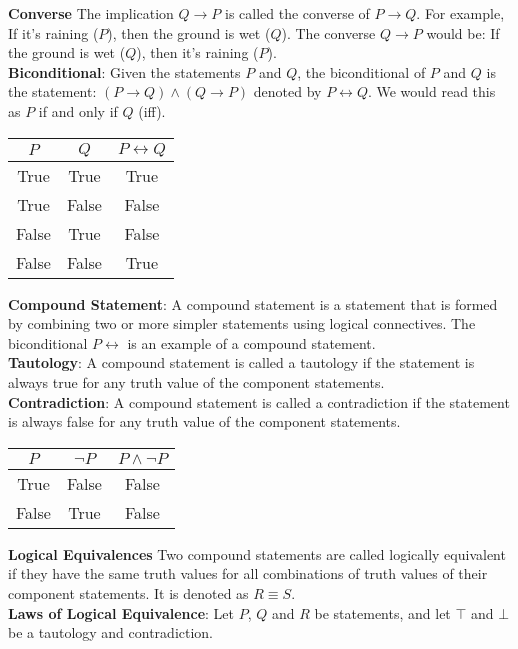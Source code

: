 \documentclass{article}
\begin{document}
\textbf{Converse} The implication \(Q \rightarrow P\) is called the converse of \(P \rightarrow Q\). For example, If it's raining (\(P\)), then the ground is wet (\(Q\)). The converse \(Q \rightarrow P\) would be: If the ground is wet (\(Q\)), then it's raining (\(P\)).\\
\textbf{Biconditional}: Given the statements \(P\) and \(Q\), the biconditional of \(P\) and \(Q\) is the statement: \((P \rightarrow Q) \land (Q \rightarrow P)\) denoted by \(P \leftrightarrow Q\). We would read this as \(P\) if and only if \(Q\) (iff).
\begin{center}
\begin{tabular}{|c|c|c|}
\hline
\(P\) & \(Q\) & \(P \leftrightarrow Q\) \\
\hline
True & True & True \\
True & False & False \\
False & True & False \\
False & False & True \\
\hline
\end{tabular}
\end{center}
\textbf{Compound Statement}: A compound statement is a statement that is formed by combining two or more simpler statements using logical connectives. The biconditional \(P \leftrightarrow\) is an example of a compound statement.\\
\textbf{Tautology}: A compound statement is called a tautology if the statement is always true for any truth value of the component statements.\\
\textbf{Contradiction}:  A compound statement is called a contradiction if the statement is always false for any truth value of the component statements.
\begin{center}
\begin{tabular}{|c|c|c|}
\hline
\(P\) & \(\neg P\) & \(P \land \neg P\) \\
\hline
True & False & False \\
False & True & False \\
\hline
\end{tabular}
\end{center}
\textbf{Logical Equivalences} Two compound statements are called logically equivalent if they have the same truth values for all combinations of truth values of their component statements. It is denoted as \(R \equiv S\).\\
\textbf{Laws of Logical Equivalence}: Let \(P\), \(Q\) and \(R\) be statements, and let \(\top\) and \(\bot\) be a tautology and contradiction.\\
\end{document}
